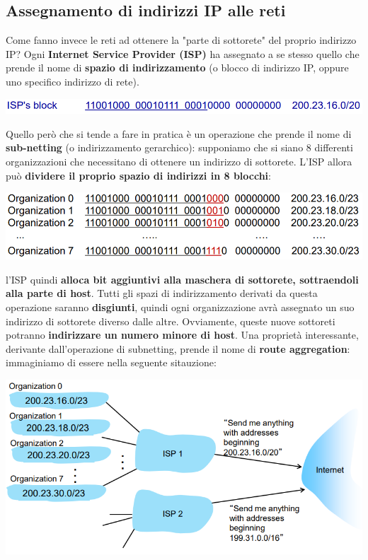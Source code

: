 \documentclass[12pt]{article}
\begin{document}
\subsection{Assegnamento di indirizzi IP alle reti}
Come fanno invece le reti ad ottenere la "parte di sottorete" del proprio indirizzo IP?
Ogni \textbf{Internet Service Provider (ISP)} ha assegnato a se stesso quello che prende il nome di \textbf{spazio di indirizzamento} (o blocco di indirizzo IP, oppure uno specifico indirizzo di rete).
\begin{center}
    \includegraphics[width =0.90\linewidth]{Images/90.png}
\end{center}
Quello però che si tende a fare in pratica è un operazione che prende il nome di \textbf{sub-netting} (o indirizzamento gerarchico): supponiamo che si siano 8 differenti organizzazioni che 
necessitano di ottenere un indirizzo di sottorete. L'ISP allora può \textbf{dividere il proprio spazio di indirizzi in 8 blocchi}:  
\begin{center}
    \includegraphics[width =0.80\linewidth]{Images/91.png}
\end{center}
l'ISP quindi \textbf{alloca bit aggiuntivi alla maschera di sottorete, sottraendoli alla parte di host}.
Tutti gli spazi di indirizzamento derivati da questa operazione saranno \textbf{disgiunti}, quindi ogni organizzazione avrà assegnato un suo indirizzo di sottorete
diverso dalle altre. Ovviamente, queste nuove sottoreti potranno \textbf{indirizzare un numero minore di host}.
Una proprietà interessante, derivante dall'operazione di subnetting, prende il nome di \textbf{route aggregation}:
immaginiamo di essere nella seguente sitauzione:
\begin{center}
    \includegraphics[width =0.80\linewidth]{Images/92.png}
\end{center}
\end{document}
